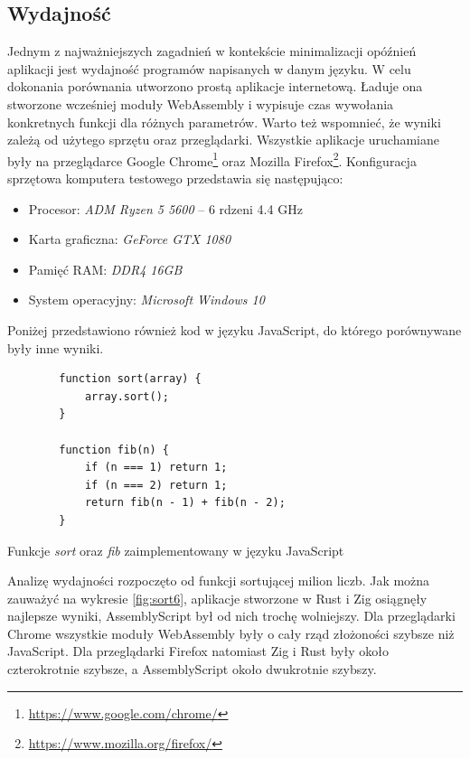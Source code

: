 \documentclass[language=polish,type=master]{aghmodern}
\begin{document}
\subsection{Wydajność}
Jednym z najważniejszych zagadnień w kontekście minimalizacji opóźnień aplikacji jest wydajność programów napisanych w danym języku.
W celu dokonania porównania utworzono prostą aplikacje internetową.
Ładuje ona stworzone wcześniej moduły WebAssembly i wypisuje czas wywołania konkretnych funkcji dla różnych parametrów.
Warto też wspomnieć, że wyniki zależą od użytego sprzętu oraz przeglądarki.
Wszystkie aplikacje uruchamiane były na przeglądarce Google Chrome\footnote{\url{https://www.google.com/chrome/}} oraz Mozilla Firefox\footnote{\url{https://www.mozilla.org/firefox/}}.
Konfiguracja sprzętowa komputera testowego przedstawia się następująco:
\begin{itemize}
    \itemsep0em
    \item Procesor: \emph{ADM Ryzen 5 5600} -- 6 rdzeni 4.4 GHz
    \item Karta graficzna: \emph{GeForce GTX 1080}
    \item Pamięć RAM: \emph{DDR4 16GB}
    \item System operacyjny: \emph{Microsoft Windows 10}
\end{itemize}

Poniżej przedstawiono również kod w języku JavaScript, do którego porównywane były inne wyniki.

\begin{listing}[H]
    \begin{verbatim}
        function sort(array) {
            array.sort();
        }

        function fib(n) {
            if (n === 1) return 1;
            if (n === 2) return 1;
            return fib(n - 1) + fib(n - 2); 
        }
    \end{verbatim}
    \caption{Funkcje \emph{sort} oraz \emph{fib} zaimplementowany w języku JavaScript}
\end{listing}

Analizę wydajności rozpoczęto od funkcji sortującej milion liczb.
Jak można zauważyć na wykresie \ref{fig:sort6}, aplikacje stworzone w Rust i Zig osiągnęły najlepsze wyniki, AssemblyScript był od nich trochę wolniejszy.
Dla przeglądarki Chrome wszystkie moduły WebAssembly były o cały rząd złożoności szybsze niż JavaScript.
Dla przeglądarki Firefox natomiast Zig i Rust były około czterokrotnie szybsze, a AssemblyScript około dwukrotnie szybszy.
\end{document}
